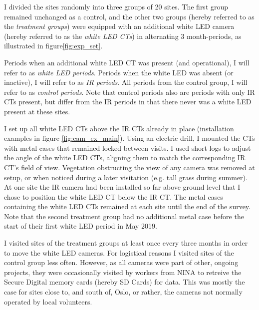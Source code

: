 I divided the sites randomly into three groups of 20 sites.
The first group remained unchanged as a control, and the other two groups (hereby referred to as the \emph{treatment groups}) were equipped with an additional white LED camera (hereby referred to as the \emph{white LED CTs}) in alternating 3 month-periods, as illustrated in figure\vref{fig:exp_set}.

Periods when an additional white LED CT was present (and operational), I will refer to as \emph{white LED periods}.
Periods when the white LED was absent (or inactive), I will refer to as \emph{IR periods}.
All periods from the control group, I will refer to as \emph{control periods}.
Note that control periods also are periods with only IR CTs present, but differ from the IR periods in that there never was a white LED present at these sites.

I set up all white LED CTs above the IR CTs already in place (installation examples in figure \ref{fig:cam_ex_main}).
Using an electric drill, I mounted the CTs with metal cases that remained locked between visits.
I used short logs to adjust the angle of the white LED CTs, aligning them to match the corresponding IR CT's field of view.
Vegetation obstructing the view of any camera was removed at setup, or when noticed during a later visitation (e.g. tall grass during summer).
At one site the IR camera had been installed so far above ground level that I chose to position the white LED CT below the IR CT. %
The metal cases containing the white LED CTs remained at each site until the end of the survey. Note that the second treatment group had no additional metal case before the start of their first white LED period in May 2019.






I visited sites of the treatment groups at least once every three months in order to move the white LED cameras.
For logistical reasons I visited sites of the control group less often.
However, as all cameras were part of other, ongoing projects, they were occasionally visited by workers from NINA to retreive the Secure Digital memory cards (hereby SD Cards) for data. %
This was mostly the case for sites close to, and south of, Oslo, or rather, the cameras not normally operated by local volunteers.








